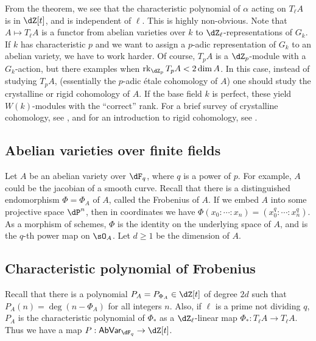 From the theorem, we see that the characteristic polynomial of $\alpha$ acting 
on $T_\ell A$ is in $\dZ[t]$, and is independent of $\ell$. This is highly 
non-obvious. Note that $A\mapsto T_\ell A$ is a functor from abelian varieties 
over $k$ to $\dZ_\ell$-representations of $G_k$. If $k$ has characteristic $p$ 
and we want to assign a $p$-adic representation of $G_k$ to an abelian variety, 
we have to work harder. Of course, $T_p A$ is a $\dZ_p$-module with a 
$G_k$-action, but there examples when $\rank_{\dZ_p} T_p A < 2\dim A$. In this 
case, instead of studying $T_p A$, (essentially the $p$-adic \'etale cohomology 
of $A$) one should study the crystalline or rigid cohomology of $A$. If the 
base field $k$ is perfect, these yield $W(k)$-modules with the ``correct'' 
rank. For a brief survey of crystalline cohomology, see \cite{il94}, and for an  
introduction to rigid cohomology, see \cite{st07}. 










\subsection{Abelian varieties over finite fields}\label{sec:ab-fin-fld}

Let $A$ be an abelian variety over $\dF_q$, where $q$ is a power of $p$. For 
example, $A$ could be the jacobian of a smooth curve. Recall that there is a 
distinguished endomorphism $\Phi=\Phi_A$ of $A$, called the Frobenius of $A$. 
If we embed $A$ into some projective space $\dP^n$, then in coordinates we 
have $\Phi(x_0:\cdots:x_n) = (x_0^q:\cdots:x_n^q)$. As a morphism of schemes, 
$\Phi$ is the identity on the underlying space of $A$, and is the $q$-th power 
map on $\sO_A$. Let $d\geqslant 1$ be the dimension of $A$. 


\subsection{Characteristic polynomial of Frobenius}\label{sec:char-frob}

Recall that there is a polynomial $P_A=P_{\Phi_A}\in \dZ[t]$ of degree $2 d$ 
such that $P_A(n)=\deg(n-\Phi_A)$ for all integers $n$. Also, if $\ell$ is a 
prime not dividing $q$, $P_A$ is the characteristic polynomial of $\Phi_\ast$ 
as a $\dZ_\ell$-linear map $\Phi_\ast:T_\ell A\to T_\ell A$. Thus we have a 
map $P:\mathsf{AbVar}_{\dF_q} \to \dZ[t]$. 

